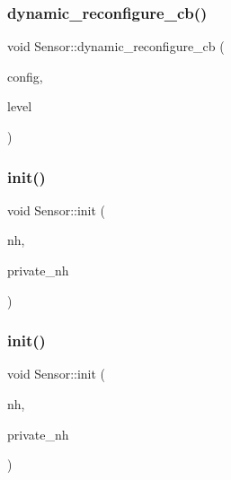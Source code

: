 \mbox{\label{classSensor_ad0edde48f6e1472b6535d5c07c36b610}} 
\subsubsection{\texorpdfstring{dynamic\+\_\+reconfigure\+\_\+cb()}{dynamic\_reconfigure\_cb()}\hspace{0.1cm}{\footnotesize\ttfamily [2/2]}}
{\footnotesize\ttfamily void Sensor\+::dynamic\+\_\+reconfigure\+\_\+cb (\begin{DoxyParamCaption}\item[{dynamic\+\_\+obstacle\+\_\+tracking\+::zr300\+Config \&}]{config,  }\item[{uint32\+\_\+t}]{level }\end{DoxyParamCaption})\hspace{0.3cm}{\ttfamily [private]}}

\mbox{\label{classSensor_a58bef8bf460ad94b9d95fedd866bcbc4}} 
\subsubsection{\texorpdfstring{init()}{init()}\hspace{0.1cm}{\footnotesize\ttfamily [1/2]}}
{\footnotesize\ttfamily void Sensor\+::init (\begin{DoxyParamCaption}\item[{ros\+::\+Node\+Handle \&}]{nh,  }\item[{ros\+::\+Node\+Handle \&}]{private\+\_\+nh }\end{DoxyParamCaption})}

\mbox{\label{classSensor_a58bef8bf460ad94b9d95fedd866bcbc4}} 
\subsubsection{\texorpdfstring{init()}{init()}\hspace{0.1cm}{\footnotesize\ttfamily [2/2]}}
{\footnotesize\ttfamily void Sensor\+::init (\begin{DoxyParamCaption}\item[{ros\+::\+Node\+Handle \&}]{nh,  }\item[{ros\+::\+Node\+Handle \&}]{private\+\_\+nh }\end{DoxyParamCaption})}


